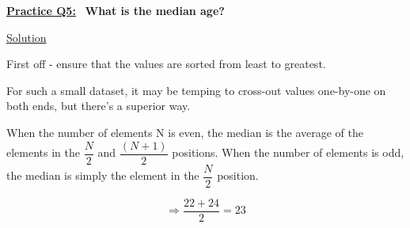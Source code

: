 \underline{\textbf{Practice Q5:}} \ \textbf{What is the median age?}

\bigskip

\underline{Solution}

First off - ensure that the values are sorted from least to greatest.

For such a small dataset, it may be temping to cross-out values one-by-one on
both ends, but there's a superior way.

When the number of elements N is even, the median is the average of the elements
in the $\dfrac{N}{2}$ and $\dfrac{(N+1)}{2}$ positions. When the number of
elements is odd, the median is simply the element in the $\dfrac{N}{2}$
position.

\[
    \Rightarrow \dfrac{22+24}{2} = \boxed{23}
\]